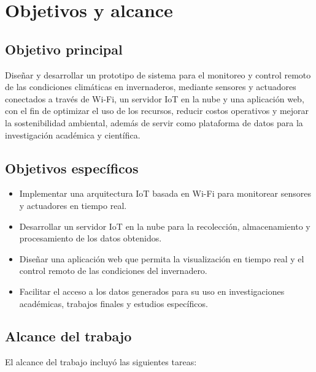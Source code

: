 
\section{Objetivos y alcance}

\subsection{Objetivo principal}

Diseñar y desarrollar un prototipo de sistema para el monitoreo y control
remoto de las condiciones climáticas en invernaderos, mediante sensores y
actuadores conectados a través de Wi-Fi, un servidor IoT en la nube y una
aplicación web, con el fin de optimizar el uso de los recursos, reducir costos
operativos y mejorar la sostenibilidad ambiental, además de servir como
plataforma de datos para la investigación académica y científica.

\subsection{Objetivos específicos}

\begin{itemize}
      \item Implementar una arquitectura IoT basada en Wi-Fi para monitorear sensores y
            actuadores en tiempo real.
      \item Desarrollar un servidor IoT en la nube para la recolección, almacenamiento y
            procesamiento de los datos obtenidos.
      \item Diseñar una aplicación web que permita la visualización en tiempo real y el
            control remoto de las condiciones del invernadero.
      \item Facilitar el acceso a los datos generados para su uso en investigaciones
            académicas, trabajos finales y estudios específicos.
\end{itemize}

\subsection{Alcance del trabajo}

El alcance del trabajo incluyó las siguientes tareas:


